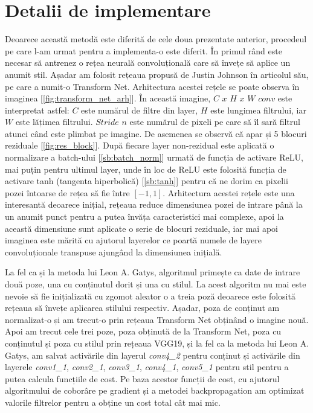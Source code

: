 \section{Detalii de implementare}
Deoarece această metodă este diferită de cele doua prezentate anterior, procedeul pe care l-am urmat pentru a implementa-o este diferit. În primul rând este necesar să antrenez o rețea neurală convoluțională care să învețe să aplice un anumit stil. Așadar am folosit rețeaua propusă de Justin Johnson în articolul său, pe care a numit-o Transform Net. Arhitectura acestei rețele se poate observa în imaginea [\ref{fig:transform_net_arh}]. În această imagine, $C$ $x$ $H$ $x$ $W$ $conv$ este interpretat astfel: $C$ este numărul de filtre din layer, $H$ este lungimea filtrului, iar $W$ este lățimea filtrului. $Stride$ $n$ este numărul de pixeli pe care să îl sară filtrul atunci când este plimbat pe imagine. De asemenea se observă că apar și 5 blocuri reziduale [\ref{fig:res_block}]. După fiecare layer non-rezidual este aplicată o normalizare a batch-ului [\ref{sb:batch_norm}] urmată de funcția de activare ReLU, mai puțin pentru ultimul layer, unde în loc de ReLU este folosită funcția de activare tanh (tangenta hiperbolică) [\ref{sb:tanh}] pentru că ne dorim ca pixelii pozei întoarse de rețea să fie între $[-1, 1]$. Arhitectura acestei rețele este una interesantă deoarece inițial, rețeaua reduce dimensiunea pozei de intrare până la un anumit punct pentru a putea învăța caracteristici mai complexe, apoi la această dimensiune sunt aplicate o serie de blocuri reziduale, iar mai apoi imaginea este mărită cu ajutorul layerelor ce poartă numele de layere convoluționale transpuse ajungând la dimensiunea inițială.

La fel ca și la metoda lui Leon A. Gatys, algoritmul primește ca date de intrare două poze, una cu conținutul dorit și una cu stilul. La acest algoritm nu mai este nevoie să fie inițializată cu zgomot aleator o a treia poză deoarece este folosită rețeaua să învețe aplicarea stilului respectiv. Așadar, poza de conținut am normalizat-o și am trecut-o prin rețeaua Transform Net obținând o imagine nouă. Apoi am trecut cele trei poze, poza obținută de la Transform Net, poza cu conținutul și poza cu stilul prin rețeaua VGG19, și la fel ca la metoda lui Leon A. Gatys, am salvat activările din layerul \textit{conv4{\_}2} pentru conținut și activările din layerele \textit{conv1{\_}1}, \textit{conv2{\_}1}, \textit{conv3{\_}1}, \textit{conv4{\_}1}, \textit{conv5{\_}1} pentru stil pentru a putea calcula funcțiile de cost. Pe baza acestor funcții de cost, cu ajutorul algoritmului de coborâre pe gradient și a metodei backpropagation am optimizat valorile filtrelor pentru a obține un cost total cât mai mic.

